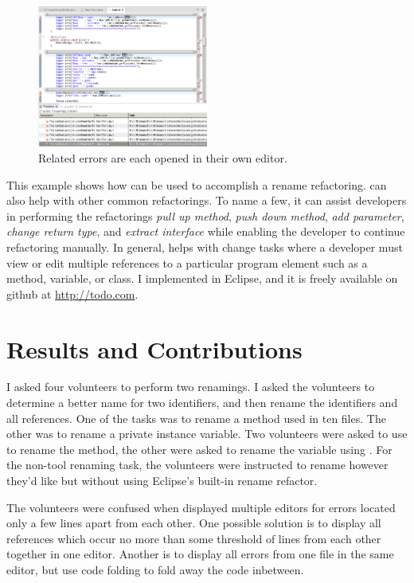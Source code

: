 \documentclass{sigplanconf}
\begin{document}
\begin{figure}
\begin{center}
\includegraphics[width=0.50\textwidth]{multiple-editors.png}
\caption{Related errors are each opened in their own editor.\label{mult}}
\end{center}
\end{figure}

This example shows how \pname{} can be used to accomplish a rename refactoring.
\pname{} can also help with other common refactorings.
To name a few, it can assist developers in performing the refactorings
\textit{pull up method}, \textit{push down method}, \textit{add parameter},
\textit{change return type}, and \textit{extract interface}
while enabling the developer to continue refactoring manually. In general,
\pname{} helps with change tasks where a developer must view or edit multiple
references to a particular program element such as a method, variable, or
class.
I implemented \pname{} in Eclipse, and it is freely available on
github at \url{http://todo.com}.

\section{Results and Contributions}
I asked four volunteers to perform two renamings. I asked the volunteers to
determine a better
name for two identifiers, and then rename the identifiers and all references.
One of the tasks was to rename a method used in
ten files. The other was to rename a private instance variable. Two volunteers
were asked to use \pname{} to rename the method, the other were asked
to rename the variable using \pname{}.
For the non-tool renaming task, the volunteers were instructed to rename however
they'd like but without using Eclipse's built-in rename refactor.

The volunteers were confused when \pname{} displayed multiple editors for errors
located only a few lines apart from each other. One possible solution is to
display all references which occur no more than some threshold of lines from
each other together in one editor. Another is to display all errors from one
file in the same editor, but use code folding to fold away the code inbetween.
\end{document}
